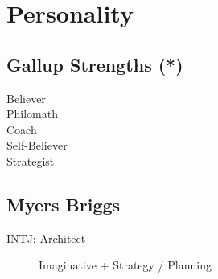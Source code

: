 \documentclass[10pt, a4paper, twocolumn]{article}
\begin{document}
%

\vfill\eject


\section*{Personality}

\subsection*{Gallup Strengths (*)}
\begin{description}
 \item [Believer]
 \item [Philomath]
 \item [Coach]
 \item [Self-Believer]
 \item [Strategist]
\end{description}



\subsection*{Myers Briggs}
\begin{description}

 \item[INTJ: Architect] %
 \item[] Imaginative + Strategy / Planning
\end{description}
\end{document}
